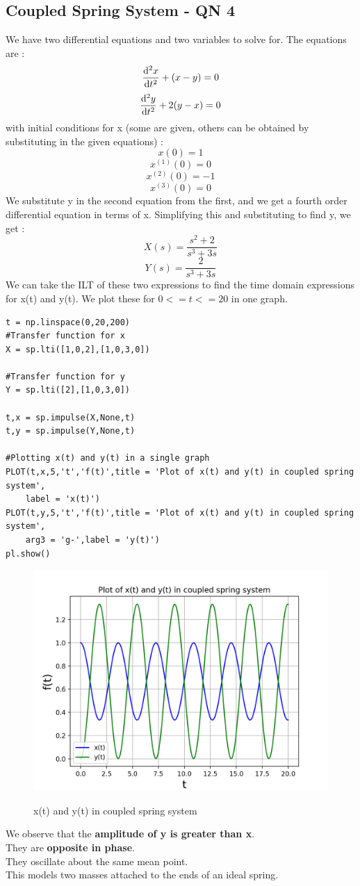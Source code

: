 \documentclass[11pt, a4paper]{article}
\begin{document}
\subsection{Coupled Spring System - QN 4}
{
We have two differential equations and two variables to solve for.
The equations are :
\[\dv[2]{x}{t} +(x-y) = 0 \]
\[\dv[2]{y}{t} +2(y-x) = 0 \]
with  initial conditions for x (some are given, others can be obtained by substituting in the given equations) :
\[x(0) = 1\]
\[x^{(1)}(0) = 0\]
\[x^{(2)}(0) = -1\]
\[x^{(3)}(0) = 0\]
We substitute y in the second equation from the first, and we get a fourth order differential equation in terms of x.
Simplifying this and substituting to find y, we get :
\[X(s) = \frac{s^2+2}{s^3+3s} \]
\[Y(s) =  \frac{2}{s^3+3s} \]
We can take the ILT of these two expressions to find the time domain expressions for x(t) and y(t).
We plot these for $0 <= t<= 20$ in one graph.
}
\begin{verbatim}
t = np.linspace(0,20,200)
#Transfer function for x
X = sp.lti([1,0,2],[1,0,3,0])

#Transfer function for y
Y = sp.lti([2],[1,0,3,0])

t,x = sp.impulse(X,None,t)
t,y = sp.impulse(Y,None,t)

#Plotting x(t) and y(t) in a single graph
PLOT(t,x,5,'t','f(t)',title = 'Plot of x(t) and y(t) in coupled spring system',
	label = 'x(t)')
PLOT(t,y,5,'t','f(t)',title = 'Plot of x(t) and y(t) in coupled spring system',
	arg3 = 'g-',label = 'y(t)')
pl.show()

\end{verbatim}
\begin{figure}[H]
   	\centering
   	\includegraphics[scale=0.6]{cs_xy.png}
   	\label{fig:cs_xy}
   	\caption{x(t) and y(t) in coupled spring system}
\end{figure}
{ 
We observe that the \textbf{amplitude of y is greater than x}. 
\\They are \textbf{opposite in phase}.
\\They oscillate about the same mean point.
\\This models two masses attached to the ends of an ideal spring.
}
\end{document}
